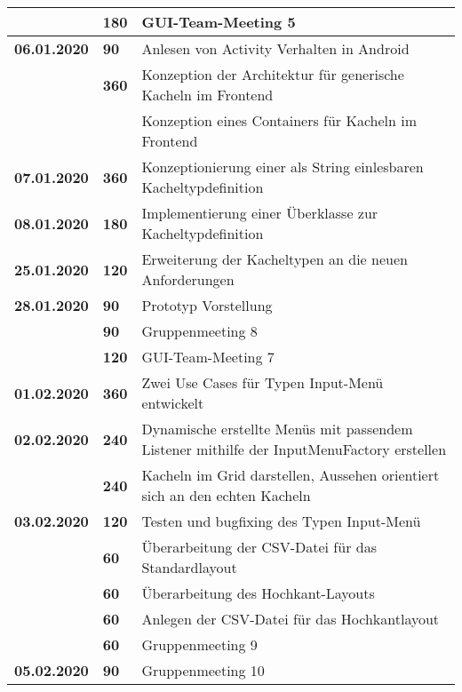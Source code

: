 {{\begin{longtable}{|l|l|p{11cm}|}
		& \textbf{\hfill 180} & GUI-Team-Meeting 5
		\\	
		\hline \textbf{06.01.2020}
		& \textbf{\hfill 90} & Anlesen von Activity Verhalten in Android \\\cline{2-3}
		& \textbf{\hfill 360} & Konzeption der Architektur für generische Kacheln im Frontend \\
		& & Konzeption eines Containers für Kacheln im Frontend
		\\	
		\hline \textbf{07.01.2020}
		& \textbf{\hfill 360} & Konzeptionierung einer als String einlesbaren Kacheltypdefinition
		\\	
		\hline \textbf{08.01.2020}
		& \textbf{\hfill 180} & Implementierung einer Überklasse zur Kacheltypdefinition
		\\
		\hline \textbf{25.01.2020}
		& \textbf{\hfill 120} & Erweiterung der Kacheltypen an die neuen Anforderungen
		\\		
		\hline \textbf{28.01.2020}
		& \textbf{\hfill 90} & Prototyp Vorstellung \\\cline{2-3}
		& \textbf{\hfill 90} & Gruppenmeeting 8 \\\cline{2-3}
		& \textbf{\hfill 120} & GUI-Team-Meeting 7
		\\	
		\hline \textbf{01.02.2020}
		& \textbf{\hfill 360} & Zwei  Use Cases für Typen Input-Menü entwickelt
		\\	
		\hline \textbf{02.02.2020}
		& \textbf{\hfill 240} & Dynamische erstellte Menüs mit passendem Listener mithilfe der InputMenuFactory erstellen \\\cline{2-3}
		& \textbf{\hfill 240} & Kacheln im Grid darstellen, Aussehen orientiert sich an den echten Kacheln
		\\	
		\hline \textbf{03.02.2020}
		& \textbf{\hfill 120} & Testen und bugfixing des Typen Input-Menü \\\cline{2-3}
		& \textbf{\hfill 60} & Überarbeitung der CSV-Datei für das Standardlayout \\\cline{2-3}
		& \textbf{\hfill 60} & Überarbeitung des Hochkant-Layouts \\\cline{2-3}
		& \textbf{\hfill 60} & Anlegen der CSV-Datei für das Hochkantlayout \\\cline{2-3}
		& \textbf{\hfill 60} & Gruppenmeeting 9
		\\
		\hline \textbf{05.02.2020}
		& \textbf{\hfill 90} & Gruppenmeeting 10
		\\ \hline\hline
	\end{longtable}
}

}
